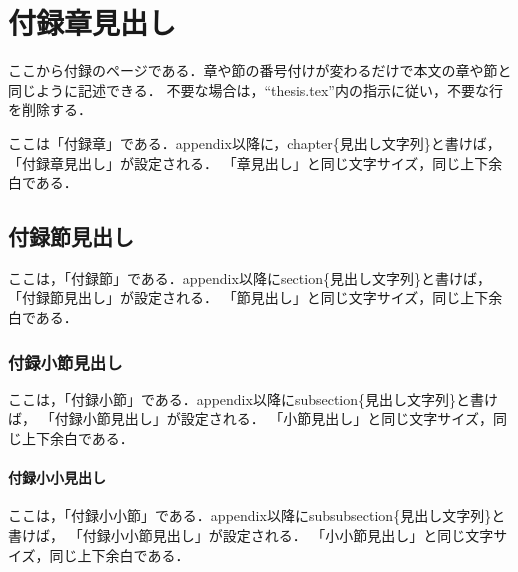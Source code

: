 \clearpage
\fancyhead[L]{\nouppercase{\small\leftmark}}
\fancyhead[R]{\nouppercase{\small\rightmark}}
\fancyfoot[C]{--\ \thepage\ --}
\renewcommand{\headrulewidth}{0.3truemm}
\appendix
\chapter{付録章見出し}
ここから付録のページである．章や節の番号付けが変わるだけで本文の章や節と同じように記述できる．
不要な場合は，``\textsf{thesis.tex}''内の指示に従い，不要な行を削除する．

ここは「付録章」である．\textsf{\yen appendix}以降に，\textsf{\yen chapter\{見出し文字列\}}と書けば，
「付録章見出し」が設定される．
「章見出し」と同じ文字サイズ，同じ上下余白である．

\section{付録節見出し}
ここは，「付録節」である．\textsf{\yen appendix}以降に\textsf{\yen section\{見出し文字列\}}と書けば，
「付録節見出し」が設定される．
「節見出し」と同じ文字サイズ，同じ上下余白である．

\subsection{付録小節見出し}
ここは，「付録小節」である．\textsf{\yen appendix}以降に\textsf{\yen subsection\{見出し文字列\}}と書けば，
「付録小節見出し」が設定される．
「小節見出し」と同じ文字サイズ，同じ上下余白である．

\subsubsection{付録小小見出し}
ここは，「付録小小節」である．\textsf{\yen appendix}以降に\textsf{\yen subsubsection\{見出し文字列\}}と書けば，
「付録小小節見出し」が設定される．
「小小節見出し」と同じ文字サイズ，同じ上下余白である．